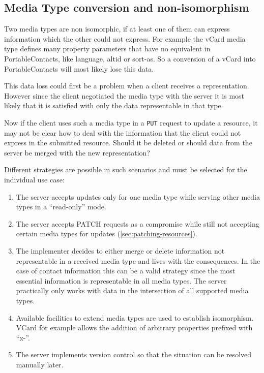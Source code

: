 \documentclass[11pt,a4paper,headsepline,twoside]{scrartcl}		%
\begin{document}


\subsection{Media Type conversion and non-isomorphism}

Two media types are non isomorphic, if at least one of them can express
information which the other could not express. For example the vCard media type
defines many property parameters that have no equivalent in PortableContacts,
like language, altid or sort-as. So a conversion of a vCard into
PortableContacts will most likely lose this data.

This data loss could first be a problem when a client receives a
representation. However since the client negotiated the media type with the
server it is most likely that it is satisfied with only the data representable
in that type.

Now if the client uses such a media type in a \lstinline:PUT: request to update
a resource, it may not be clear how to deal with the information that the client
could not express in the submitted resource. Should it be deleted or should data
from the server be merged with the new representation?

Different strategies are possible in such scenarios and must be selected for the
individual use case:

\begin{enumerate}
\item The server accepts updates only for one media type while serving other
  media types in a ``read-only'' mode.
\item The server accepts PATCH requests \cite{RFC5789} as a compromise while
  still not accepting certain media types for updates
  (\autoref{sec:patching-resources}).
\item The implementer decides to either merge or delete information not
  representable in a received media type and lives with the consequences. In the
  case of contact information this can be a valid strategy since the most
  essential information is representable in all media types. The server
  practically only works with data in the intersection of all supported
  media types.
\item Available facilities to extend media types are used to establish
  isomorphism. VCard for example allows the addition of arbitrary properties
  prefixed with ``x-''.
\item The server implements version control so that the situation can be
  resolved manually later.
\end{enumerate}
\end{document}
